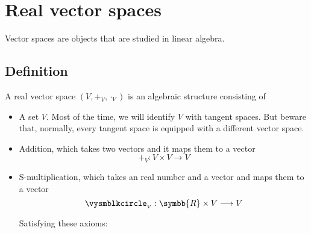 \section{Real vector spaces}
Vector spaces are objects that are studied in linear algebra.

\subsection{Definition}
A real vector space $(V,+_{\scriptscriptstyle V},\cdot_{\scriptscriptstyle V})$ is an algebraic
structure consisting of
\begin{itemize}
\item A set $V$. Most of the time, we will identify $V$ with tangent spaces. But beware that,
  normally, every tangent space is equipped with a different vector space.
\item Addition, which takes two vectors and it maps them to a vector
  \[
    +_{\scriptscriptstyle V} : V\times V \longrightarrow V
  \]
\item S-multiplication\footnotemark{},
  which takes an real number\footnotemark{} and a vector
  and maps them to a vector
  \[
    \vysmblkcircle_{\scriptscriptstyle V} : \symbb{R}\times V \longrightarrow V
  \]
  
  \vspace{-2ex}
  Satisfying these axioms\footnotemark{}:
  

\end{itemize}
